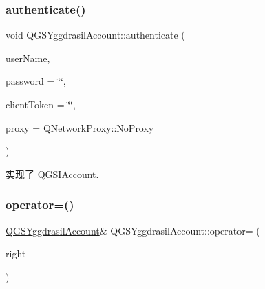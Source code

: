 \subsubsection{\texorpdfstring{authenticate()}{authenticate()}}
{\footnotesize\ttfamily void Q\+G\+S\+Yggdrasil\+Account\+::authenticate (\begin{DoxyParamCaption}\item[{const Q\+String \&}]{user\+Name,  }\item[{const Q\+String \&}]{password = {\ttfamily \char`\"{}\char`\"{}},  }\item[{Q\+String}]{client\+Token = {\ttfamily \char`\"{}\char`\"{}},  }\item[{Q\+Network\+Proxy}]{proxy = {\ttfamily QNetworkProxy\+:\+:NoProxy} }\end{DoxyParamCaption})\hspace{0.3cm}{\ttfamily [virtual]}}



实现了 \mbox{\hyperlink{class_q_g_s_i_account_ad10a95dcbe8f6071d63ecfdf60f40609}{Q\+G\+S\+I\+Account}}.

\mbox{\label{class_q_g_s_yggdrasil_account_a9e8f8a5eee8beae12b5dc4e6d51e1765}} 
\subsubsection{\texorpdfstring{operator=()}{operator=()}\hspace{0.1cm}{\footnotesize\ttfamily [1/2]}}
{\footnotesize\ttfamily \mbox{\hyperlink{class_q_g_s_yggdrasil_account}{Q\+G\+S\+Yggdrasil\+Account}}\& Q\+G\+S\+Yggdrasil\+Account\+::operator= (\begin{DoxyParamCaption}\item[{const \mbox{\hyperlink{class_q_g_s_yggdrasil_account}{Q\+G\+S\+Yggdrasil\+Account}} \&}]{right }\end{DoxyParamCaption})\hspace{0.3cm}{\ttfamily [delete]}}

\mbox{\label{class_q_g_s_yggdrasil_account_ace4e9bb9a6aa3015f7a5b4f7603a91e4}} 
